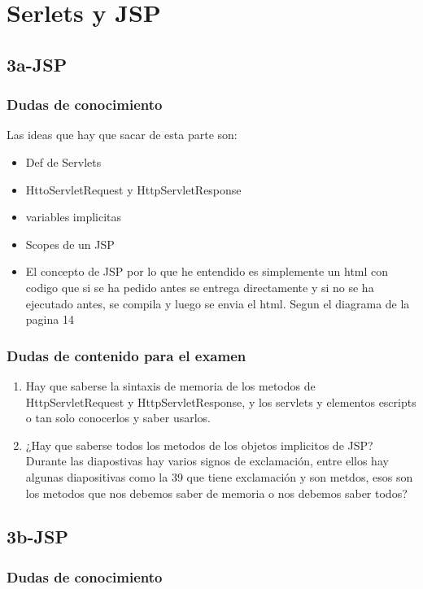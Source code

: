 \chapter{Serlets y JSP}
\section*{3a-JSP}
\subsection*{Dudas de conocimiento}


Las ideas que hay que sacar de esta parte son:
\begin{itemize}
    \item  Def de Servlets
    \item  HttoServletRequest y HttpServletResponse
    \item variables implicitas 
    \item Scopes de un JSP
\end{itemize}


\begin{itemize}
    \item El concepto de JSP por lo que he entendido es simplemente un html con codigo que si se ha pedido antes se entrega directamente y si no se ha ejecutado antes, se compila y luego se envia el html. Segun el diagrama de la pagina 14 
\end{itemize}
\subsection*{Dudas de contenido para el examen}
\begin{enumerate}
    \item Hay que saberse la sintaxis de memoria de los metodos de HttpServletRequest y HttpServletResponse, y los servlets y elementos escripts o tan solo conocerlos y saber usarlos. 
    \item ¿Hay que saberse todos los metodos de los objetos implicitos de JSP? Durante las diapostivas hay varios signos de exclamación, entre ellos hay algunas diapositivas como la 39 que tiene exclamación y son metdos, esos son los metodos que nos debemos saber de memoria o nos debemos saber todos?
\end{enumerate}

\section*{3b-JSP}
\subsection*{Dudas de conocimiento}

